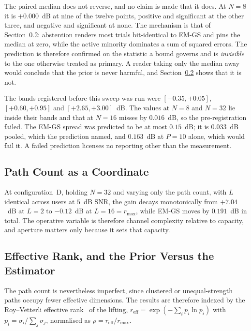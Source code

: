 \documentclass[journal]{IEEEtran}
\newcommand{\reff}{r_{\mathrm{eff}}}
\newcommand{\rmax}{r_{\max}}
\begin{document}
The paired median does not reverse, and no claim is made that it does. At $N=8$
it is $+0.000$~dB at nine of the twelve points, positive and significant at the
other three, and negative and significant at none. The mechanism is that of
Section~\ref{sec:effrank}: abstention renders most trials bit-identical to EM-GS
and pins the median at zero, while the active minority dominates a sum of
squared errors. The prediction is therefore confirmed on the statistic a bound
governs and is \emph{invisible} to the one otherwise treated as primary. A
reader taking only the median away would conclude that the prior is never
harmful, and Section~\ref{sec:effrank} shows that it is not.

The bands registered before this sweep was run were $[-0.35,+0.05]$,
$[+0.60,+0.95]$ and $[+2.65,+3.00]$~dB. The values at $N=8$ and $N=32$ lie
inside their bands and that at $N=16$ misses by $0.016$~dB, so the
pre-registration failed. The EM-GS spread was predicted to be at most $0.15$~dB;
it is $0.033$~dB pooled, which the prediction named, and $0.163$~dB at $P=10$
alone, which would fail it. A failed prediction licenses no reporting other than
the measurement.

\subsection{Path Count as a Coordinate}
\label{sec:pathcount}

At configuration~D, holding $N=32$ and varying only the path count, with $L$
identical across users at $5$~dB SNR, the gain decays monotonically from
$+7.04$~dB at $L=2$ to $-0.12$~dB at $L=16=\rmax$, while EM-GS moves by
$0.191$~dB in total. The operative variable is therefore channel complexity
relative to capacity, and aperture matters only because it sets that
capacity.

\subsection{Effective Rank, and the Prior Versus the Estimator}
\label{sec:effrank}

The path count is nevertheless imperfect, since clustered or unequal-strength
paths occupy fewer effective dimensions. The results are therefore indexed by
the Roy--Vetterli effective rank~\cite{royvetterli2007} of the lifting,
$\reff=\exp(-\sum_i p_i\ln p_i)$ with $p_i=\sigma_i/\sum_j\sigma_j$, normalised
as $\rho=\reff/\rmax$.
\end{document}
